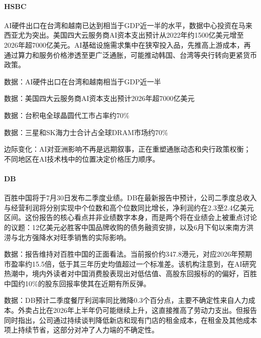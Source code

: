 \documentclass[11pt]{ctexart}
\begin{document}
\paragraph{HSBC} AI硬件出口在台湾和越南已达到相当于GDP近一半的水平，数据中心投资在马来西亚尤为突出。美国四大云服务商AI资本支出预计从2022年约1500亿美元增至2026年超7000亿美元。AI基础设施需求集中在狭窄投入品，先推高上游成本，再通过算力和服务价格渗透至更广泛通胀，可能推动韩国、台湾等央行转向更紧货币政策。
{\small\color{refgray}数据：AI硬件出口在台湾和越南相当于GDP近一半\par}
{\small\color{refgray}数据：美国四大云服务商AI资本支出预计2026年超7000亿美元\par}
{\small\color{refgray}数据：台积电全球晶圆代工市占率约70\%\par}
{\small\color{refgray}数据：三星和SK海力士合计占全球DRAM市场约70\%\par}
{\small\color{refgray}边际变化：AI对亚洲影响不再是远期叙事，正在重塑通胀动态和央行政策权衡；不同地区在AI技术栈中的位置决定价格压力顺序。\par}
\paragraph{DB} 百胜中国将于7月30日发布二季度业绩。DB在最新报告中预计，公司二季度总收入与经营利润将分别实现中个位数和高个位数同比增长，净利润约在2.3至2.4亿美元区间。这份报告的核心看点并非业绩数字本身，而是两个将在业绩会上被重点讨论的议题：12亿美元必胜客中国品牌收购的债务融资安排，以及6月下旬以来南方洪涝与北方强降水对旺季销售的实际影响。
{\small\color{refgray}数据：报告维持对百胜中国的正面看法。当前报价约347.8港元，对应2026年预期市盈率约15.5倍，低于其三年历史均值超过一个标准差。该机构注意到，在AI研究热潮中，境内外读者对中国消费股表现出对低估值、高股东回报标的的偏好，百胜中国约10\%的股东回报率使其在近期有所反弹。\par}
{\small\color{refgray}数据：DB预计二季度餐厅利润率同比微降0.3个百分点，主要不确定性来自人力成本。外卖占比在2026年上半年仍可能继续上升，这直接推高了劳动力支出。但报告同时指出，公司通过持续谈判降低新店和现有门店的租金成本，在租金及其他成本项上持续节省，这部分对冲了人力端的不确定性。\par}
\end{document}

